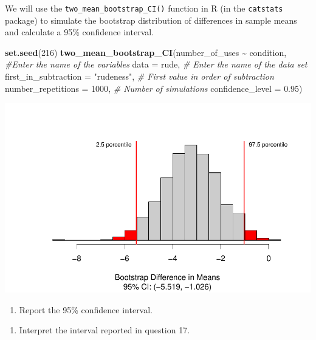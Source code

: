 \documentclass[
]{report}
\newenvironment{Shaded}{\begin{snugshade}}{\end{snugshade}}
\newcommand{\AttributeTok}[1]{\textcolor[rgb]{0.13,0.29,0.53}{#1}}
\newcommand{\CommentTok}[1]{\textcolor[rgb]{0.56,0.35,0.01}{\textit{#1}}}
\newcommand{\DecValTok}[1]{\textcolor[rgb]{0.00,0.00,0.81}{#1}}
\newcommand{\FloatTok}[1]{\textcolor[rgb]{0.00,0.00,0.81}{#1}}
\newcommand{\FunctionTok}[1]{\textcolor[rgb]{0.13,0.29,0.53}{\textbf{#1}}}
\newcommand{\NormalTok}[1]{#1}
\newcommand{\SpecialCharTok}[1]{\textcolor[rgb]{0.81,0.36,0.00}{\textbf{#1}}}
\newcommand{\StringTok}[1]{\textcolor[rgb]{0.31,0.60,0.02}{#1}}
\providecommand{\tightlist}{%
  \setlength{\itemsep}{0pt}\setlength{\parskip}{0pt}}
\begin{document}
We will use the \texttt{two\_mean\_bootstrap\_CI()} function in R (in the \texttt{catstats} package) to simulate the bootstrap distribution of differences in sample means and calculate a 95\% confidence interval.

\begin{Shaded}
\begin{Highlighting}[]
\FunctionTok{set.seed}\NormalTok{(}\DecValTok{216}\NormalTok{)}
\FunctionTok{two\_mean\_bootstrap\_CI}\NormalTok{(number\_of\_uses }\SpecialCharTok{\textasciitilde{}}\NormalTok{ condition, }\CommentTok{\#Enter the name of the variables}
                      \AttributeTok{data =}\NormalTok{ rude,  }\CommentTok{\# Enter the name of the data set}
                      \AttributeTok{first\_in\_subtraction =} \StringTok{"rudeness"}\NormalTok{, }\CommentTok{\# First value in order of subtraction}
                      \AttributeTok{number\_repetitions =} \DecValTok{1000}\NormalTok{,  }\CommentTok{\# Number of simulations}
                      \AttributeTok{confidence\_level =} \FloatTok{0.95}\NormalTok{)}
\end{Highlighting}
\end{Shaded}

\begin{center}\includegraphics[width=0.7\linewidth]{12-OCA09-inference-1ofeach-simulation_files/figure-latex/unnamed-chunk-5-1} \end{center}

\begin{enumerate}
\def\labelenumi{\arabic{enumi}.}
\setcounter{enumi}{16}
\tightlist
\item
  Report the 95\% confidence interval.
\end{enumerate}

\vspace{0.3in}

\begin{enumerate}
\def\labelenumi{\arabic{enumi}.}
\setcounter{enumi}{17}
\tightlist
\item
  Interpret the interval reported in question 17.
\end{enumerate}
\end{document}
